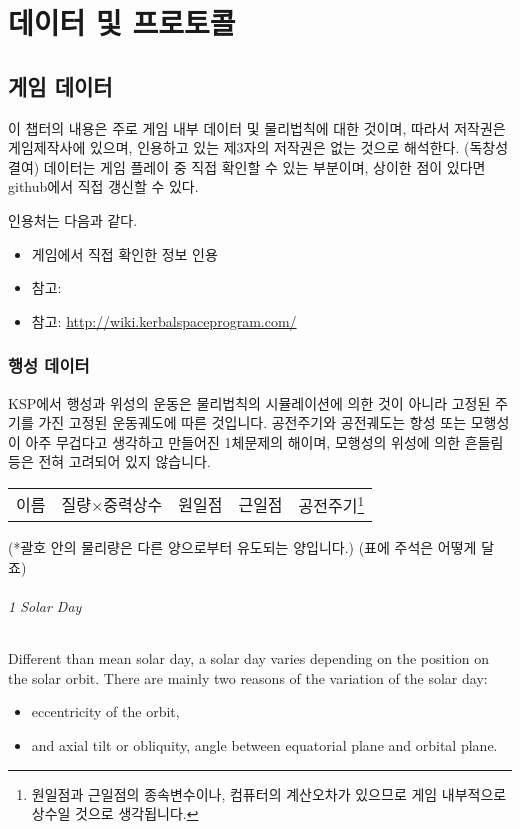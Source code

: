 \part{데이터 및 프로토콜}
\chapter{게임 데이터}
이 챕터의 내용은 주로 게임 내부 데이터 및 물리법칙에 대한 것이며, 
따라서 저작권은 게임제작사에 있으며, 인용하고 있는 제3자의 저작권은 없는 것으로 해석한다. (독창성 결여)
데이터는 게임 플레이 중 직접 확인할 수 있는 부분이며, 상이한 점이 있다면 github에서 직접 갱신할 수 있다.

인용처는 다음과 같다.
\begin{itemize}
\item 게임에서 직접 확인한 정보 인용
\item 참고: 
\item 참고: \url{http://wiki.kerbalspaceprogram.com/}
\end{itemize}

\section{행성 데이터}
KSP에서 행성과 위성의 운동은 물리법칙의 시뮬레이션에 의한 것이 아니라 고정된 주기를 가진 고정된 운동궤도에 따른 것입니다. 공전주기와 공전궤도는 항성 또는 모행성이 아주 무겁다고 생각하고 만들어진 1체문제의 해이며, 모행성의 위성에 의한 흔들림 등은 전혀 고려되어 있지 않습니다.
\begin{tabular}{|l|r|r|r|r|}
\hline
이름&질량$\times$중력상수&원일점&근일점&공전주기\footnote{원일점과 근일점의 종속변수이나, 컴퓨터의 계산오차가 있으므로 게임 내부적으로 상수일 것으로 생각됩니다.}
\end{tabular}
(*괄호 안의 물리량은 다른 양으로부터 유도되는 양입니다.)
(표에 주석은 어떻게 달죠)
\paragraph{1 Solar Day}
Different than mean solar day, a solar day varies depending on the position on the solar orbit.
There are mainly two reasons of the variation of the solar day:
\begin{itemize}
\item eccentricity of the orbit, 
\item and axial tilt or obliquity, angle between equatorial plane and orbital plane.
\end{itemize}

